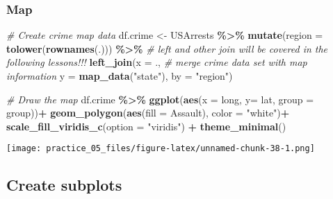 \documentclass[
]{article}
\newenvironment{Shaded}{\begin{snugshade}}{\end{snugshade}}
\newcommand{\AttributeTok}[1]{\textcolor[rgb]{0.13,0.29,0.53}{#1}}
\newcommand{\CommentTok}[1]{\textcolor[rgb]{0.56,0.35,0.01}{\textit{#1}}}
\newcommand{\FunctionTok}[1]{\textcolor[rgb]{0.13,0.29,0.53}{\textbf{#1}}}
\newcommand{\NormalTok}[1]{#1}
\newcommand{\OtherTok}[1]{\textcolor[rgb]{0.56,0.35,0.01}{#1}}
\newcommand{\SpecialCharTok}[1]{\textcolor[rgb]{0.81,0.36,0.00}{\textbf{#1}}}
\newcommand{\StringTok}[1]{\textcolor[rgb]{0.31,0.60,0.02}{#1}}
\begin{document}
\subsubsection{Map}\label{map}

\begin{Shaded}
\begin{Highlighting}[]
\CommentTok{\#   Create crime map data}
\NormalTok{df.crime }\OtherTok{\textless{}{-}}\NormalTok{ USArrests }\SpecialCharTok{\%\textgreater{}\%} 
  \FunctionTok{mutate}\NormalTok{(}\AttributeTok{region =} \FunctionTok{tolower}\NormalTok{(}\FunctionTok{rownames}\NormalTok{(.))) }\SpecialCharTok{\%\textgreater{}\%} 
  \CommentTok{\# left and other join will be covered in the following lessons!!!}
  \FunctionTok{left\_join}\NormalTok{(}\AttributeTok{x =}\NormalTok{ .,  }\CommentTok{\# merge crime data set with map information}
            \AttributeTok{y =} \FunctionTok{map\_data}\NormalTok{(}\StringTok{"state"}\NormalTok{),}
            \AttributeTok{by =} \StringTok{"region"}\NormalTok{)}

\CommentTok{\#   Draw the map}
\NormalTok{df.crime }\SpecialCharTok{\%\textgreater{}\%} 
\FunctionTok{ggplot}\NormalTok{(}\FunctionTok{aes}\NormalTok{(}\AttributeTok{x =}\NormalTok{ long, }
           \AttributeTok{y=}\NormalTok{ lat, }
           \AttributeTok{group =}\NormalTok{ group))}\SpecialCharTok{+}
  \FunctionTok{geom\_polygon}\NormalTok{(}\FunctionTok{aes}\NormalTok{(}\AttributeTok{fill =}\NormalTok{ Assault), }
               \AttributeTok{color =} \StringTok{"white"}\NormalTok{)}\SpecialCharTok{+}
  \FunctionTok{scale\_fill\_viridis\_c}\NormalTok{(}\AttributeTok{option =} \StringTok{"viridis"}\NormalTok{) }\SpecialCharTok{+}
  \FunctionTok{theme\_minimal}\NormalTok{()}
\end{Highlighting}
\end{Shaded}

\texttt{[image: practice\_05\_files/figure-latex/unnamed-chunk-38-1.png]}

\subsection{Create subplots}\label{create-subplots}
\end{document}
